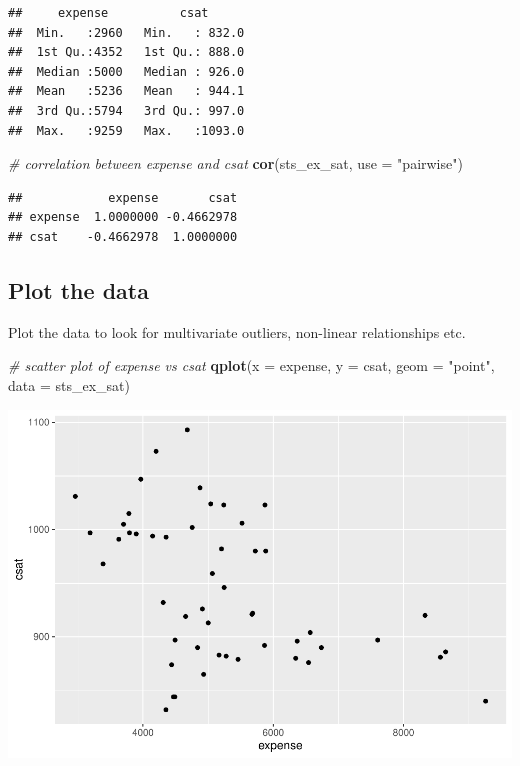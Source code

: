 \documentclass[
]{book}
\newenvironment{Shaded}{\begin{snugshade}}{\end{snugshade}}
\newcommand{\CommentTok}[1]{\textcolor[rgb]{0.56,0.35,0.01}{\textit{#1}}}
\newcommand{\DataTypeTok}[1]{\textcolor[rgb]{0.13,0.29,0.53}{#1}}
\newcommand{\KeywordTok}[1]{\textcolor[rgb]{0.13,0.29,0.53}{\textbf{#1}}}
\newcommand{\NormalTok}[1]{#1}
\newcommand{\StringTok}[1]{\textcolor[rgb]{0.31,0.60,0.02}{#1}}
\begin{document}
\begin{verbatim}
##     expense          csat       
##  Min.   :2960   Min.   : 832.0  
##  1st Qu.:4352   1st Qu.: 888.0  
##  Median :5000   Median : 926.0  
##  Mean   :5236   Mean   : 944.1  
##  3rd Qu.:5794   3rd Qu.: 997.0  
##  Max.   :9259   Max.   :1093.0
\end{verbatim}

\begin{Shaded}
\begin{Highlighting}[]
  \CommentTok{\# correlation between expense and csat}
  \KeywordTok{cor}\NormalTok{(sts\_ex\_sat, }\DataTypeTok{use =} \StringTok{"pairwise"}\NormalTok{) }
\end{Highlighting}
\end{Shaded}

\begin{verbatim}
##            expense       csat
## expense  1.0000000 -0.4662978
## csat    -0.4662978  1.0000000
\end{verbatim}

\hypertarget{plot-the-data}{%
\subsection{Plot the data}\label{plot-the-data}}

Plot the data to look for multivariate outliers, non-linear relationships etc.

\begin{Shaded}
\begin{Highlighting}[]
  \CommentTok{\# scatter plot of expense vs csat}
  \KeywordTok{qplot}\NormalTok{(}\DataTypeTok{x =}\NormalTok{ expense, }\DataTypeTok{y =}\NormalTok{ csat, }\DataTypeTok{geom =} \StringTok{"point"}\NormalTok{, }\DataTypeTok{data =}\NormalTok{ sts\_ex\_sat)}
\end{Highlighting}
\end{Shaded}

\includegraphics{R/Rmodels/figures/unnamed-chunk-83-1.pdf}
\end{document}
